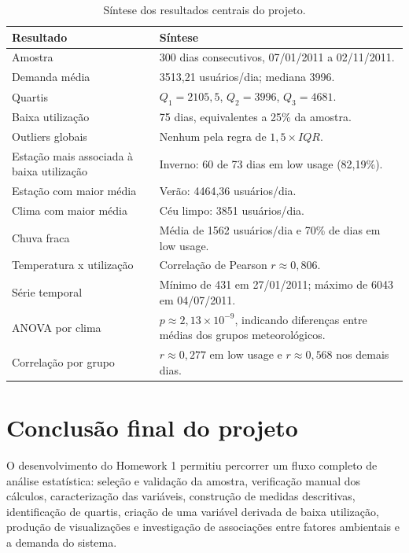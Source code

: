 \documentclass[12pt,oneside,a4paper,english,brazil]{abntex2}
\begin{document}
\begin{table}[H]
\centering
\caption{Síntese dos resultados centrais do projeto.}
\begin{tabularx}{\textwidth}{p{4.2cm}X}
\toprule
\rowcolor{lilasclaro}
\textbf{Resultado} & \textbf{Síntese} \\
\midrule
Amostra & 300 dias consecutivos, 07/01/2011 a 02/11/2011. \\
Demanda média & 3513,21 usuários/dia; mediana 3996. \\
Quartis & $Q_1=2105{,}5$, $Q_2=3996$, $Q_3=4681$. \\
Baixa utilização & 75 dias, equivalentes a 25\% da amostra. \\
Outliers globais & Nenhum pela regra de $1{,}5\times IQR$. \\
Estação mais associada à baixa utilização & Inverno: 60 de 73 dias em low usage (82,19\%). \\
Estação com maior média & Verão: 4464,36 usuários/dia. \\
Clima com maior média & Céu limpo: 3851 usuários/dia. \\
Chuva fraca & Média de 1562 usuários/dia e 70\% de dias em low usage. \\
Temperatura x utilização & Correlação de Pearson $r\approx0{,}806$. \\
Série temporal & Mínimo de 431 em 27/01/2011; máximo de 6043 em 04/07/2011. \\
ANOVA por clima & $p\approx2{,}13\times10^{-9}$, indicando diferenças entre médias dos grupos meteorológicos. \\
Correlação por grupo & $r\approx0{,}277$ em low usage e $r\approx0{,}568$ nos demais dias. \\
\bottomrule
\end{tabularx}
\end{table}

\chapter{Conclusão final do projeto}

O desenvolvimento do Homework 1 permitiu percorrer um fluxo completo de análise estatística: seleção e validação da amostra, verificação manual dos cálculos, caracterização das variáveis, construção de medidas descritivas, identificação de quartis, criação de uma variável derivada de baixa utilização, produção de visualizações e investigação de associações entre fatores ambientais e a demanda do sistema.
\end{document}
